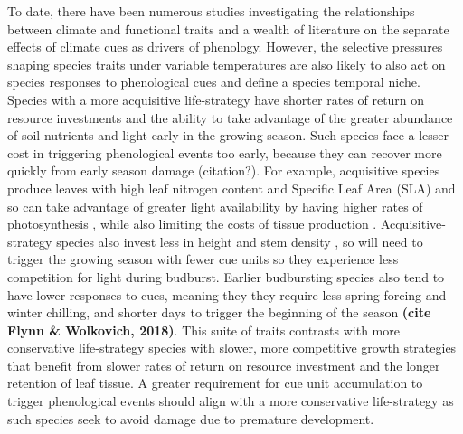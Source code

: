 \documentclass{article}\usepackage[]{graphicx}\usepackage[]{color}
\begin{document}

To date, there have been numerous studies investigating the relationships between climate and functional traits and a wealth of literature on the separate effects of climate cues as drivers of phenology. However, the selective pressures shaping species traits under variable temperatures are also likely to also act on species responses to phenological cues and define a species temporal niche. Species with a more acquisitive life-strategy  have shorter rates of return on resource investments and the ability to take advantage of the greater abundance of soil nutrients and light early in the growing season. Such species face a lesser cost in triggering phenological events too early, because they can recover more quickly from early season damage (citation?). For example, acquisitive species produce leaves with high leaf nitrogen content and Specific Leaf Area (SLA) and so can take advantage of greater light availability by having higher rates of photosynthesis \citep{Wright2004,Pereira2020}, while also limiting the costs of tissue production \citep{Lambers2004, Westoby2006, Herault2011}. Acquisitive-strategy species also invest less in height and stem density \citep{Laughlin2010}, so will need to trigger the growing season with fewer cue units so they experience less competition for light during budburst. Earlier budbursting species also tend to have lower responses to cues, meaning they they require less spring forcing and winter chilling, and shorter days to trigger the beginning of the season \textbf{(cite Flynn \& Wolkovich, 2018)}. This suite of traits contrasts with more conservative life-strategy species with slower, more competitive growth strategies that benefit from slower rates of return on resource investment and the longer retention of leaf tissue. A greater requirement for cue unit accumulation to trigger phenological events should align with a more conservative life-strategy as such species seek to avoid damage due to premature development.      
 
%
\end{document}
